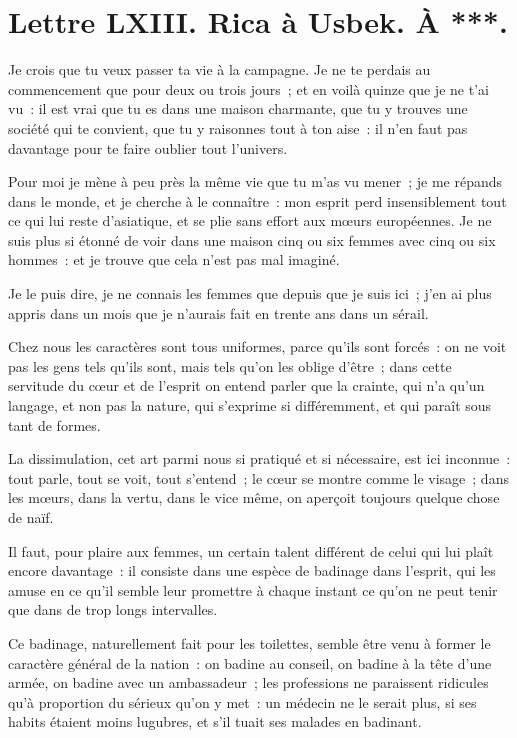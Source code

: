 \documentclass[french,twoside]{book} %
\newcommand{\dateline}[1]{\medskip{\RaggedLeft{#1}\par}\bigskip}
\begin{document}
\dateline{Du sérail d’Ispahan, le 2 de la lune de Rebiab, 1714.}
\section[{Lettre LXIII. Rica à Usbek. À ***.}]{Lettre LXIII. Rica à Usbek. À ***.}\renewcommand{\leftmark}{Lettre LXIII. Rica à Usbek. À ***.}

\noindent Je crois que tu veux passer ta vie à la campagne. Je ne te perdais au commencement que pour deux ou trois jours ; et en voilà quinze que je ne t’ai vu : il est vrai que tu es dans une maison charmante, que tu y trouves une société qui te convient, que tu y raisonnes tout à ton aise : il n’en faut pas davantage pour te faire oublier tout l’univers.\par
Pour moi je mène à peu près la même vie que tu m’as vu mener ; je me répands dans le monde, et je cherche à le connaître : mon esprit perd insensiblement tout ce qui lui reste d’asiatique, et se plie sans effort aux mœurs européennes. Je ne suis plus si étonné de voir dans une maison cinq ou six femmes avec cinq ou six hommes : et je trouve que cela n’est pas mal imaginé.\par
Je le puis dire, je ne connais les femmes que depuis que je suis ici ; j’en ai plus appris dans un mois que je n’aurais fait en trente ans dans un sérail.\par
Chez nous les caractères sont tous uniformes, parce qu’ils sont forcés : on ne voit pas les gens tels qu’ils sont, mais tels qu’on les oblige d’être ; dans cette servitude du cœur et de l’esprit on entend parler que la crainte, qui n’a qu’un langage, et non pas la nature, qui s’exprime si différemment, et qui paraît sous tant de formes.\par
La dissimulation, cet art parmi nous si pratiqué et si nécessaire, est ici inconnue : tout parle, tout se voit, tout s’entend ; le cœur se montre comme le visage ; dans les mœurs, dans la vertu, dans le vice même, on aperçoit toujours quelque chose de naïf.\par
Il faut, pour plaire aux femmes, un certain talent différent de celui qui lui plaît encore davantage : il consiste dans une espèce de badinage dans l’esprit, qui les amuse en ce qu’il semble leur promettre à chaque instant ce qu’on ne peut tenir que dans de trop longs intervalles.\par
Ce badinage, naturellement fait pour les toilettes, semble être venu à former le caractère général de la nation : on badine au conseil, on badine à la tête d’une armée, on badine avec un ambassadeur ; les professions ne paraissent ridicules qu’à proportion du sérieux qu’on y met : un médecin ne le serait plus, si ses habits étaient moins lugubres, et s’il tuait ses malades en badinant.\par
\end{document}
